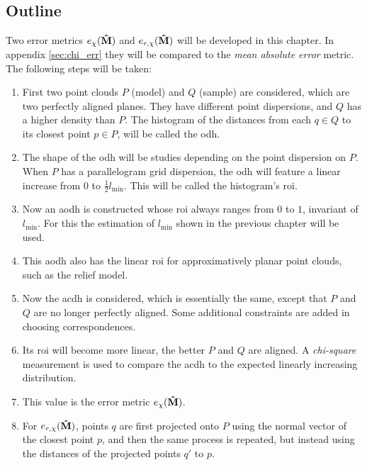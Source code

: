 \subsection{Outline}
Two error metrics $e_{\chi}(\mathbf{\hat{M}})$ and $e_{r,\chi}(\mathbf{\hat{M}})$ will be developed in this chapter. In appendix \ref{sec:chi_err} they will be compared to the \emph{mean absolute error} metric. The following steps will be taken:
\begin{enumerate}
\item First two point clouds $P$ (model) and $Q$ (sample) are considered, which are two perfectly aligned planes. They have different point dispersions, and $Q$ has a higher density than $P$. The histogram of the distances from each $q \in Q$ to its closest point $p \in P$, will be called the \gls{odh}.
\item The shape of the \gls{odh} will be studies depending on the point dispersion on $P$. When $P$ has a parallelogram grid dispersion, the \gls{odh} will feature a linear increase from $0$ to $\frac{1}{2} l_{\text{min}}$. This will be called the histogram's \gls{roi}.
\item Now an \gls{aodh} is constructed whose \gls{roi} always ranges from $0$ to $1$, invariant of $l_{\text{min}}$. For this the estimation of $l_{\text{min}}$ shown in the previous chapter will be used.
\item This \gls{aodh} also has the linear \gls{roi} for approximatively planar point clouds, such as the relief model.
\item Now the \gls{acdh} is considered, which is essentially the same, except that $P$ and $Q$ are no longer perfectly aligned. Some additional constraints are added in choosing correspondences.
\item Its \gls{roi} will become more linear, the better $P$ and $Q$ are aligned. A \emph{chi-square} measurement is used to compare the \gls{acdh} to the expected linearly increasing distribution.
\item This value is the error metric $e_{\chi}(\mathbf{\hat{M}})$.
\item For $e_{r,\chi}(\mathbf{\hat{M}})$, points $q$ are first projected onto $P$ using the normal vector of the closest point $p$, and then the same process is repeated, but instead using the distances of the projected points $q'$ to $p$.
\end{enumerate}



